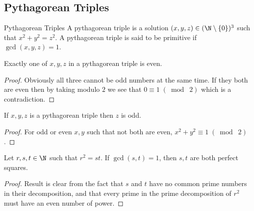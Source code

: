 \subsection{Pythagorean Triples}
\begin{defn}{Pythagorean Triples}{} A pythagorean triple is a solution $(x,y,z)\in(\N\setminus\{0\})^3$ such that $x^2+y^2=z^2$. A pythagorean triple is said to be primitive if $\gcd(x,y,z)=1$. 
\end{defn}

\begin{lmm}{}{} Exactly one of $x,y,z$ in a pythagorean triple is even. \tcbline
\begin{proof}
Obviously all three cannot be odd numbers at the same time. If they both are even then by taking modulo $2$ we see that $0\equiv 1\;(\bmod\;2)$ which is a contradiction. 
\end{proof}
\end{lmm}

\begin{lmm}{}{} If $x,y,z$ is a pythagorean triple then $z$ is odd. \tcbline
\begin{proof}
For odd or even $x,y$ such that not both are even, $x^2+y^2\equiv 1\;(\bmod\;2)$. 
\end{proof}
\end{lmm}

\begin{lmm}{}{} Let $r,s,t\in\N$ such that $r^2=st$. If $\gcd(s,t)=1$, then $s,t$ are both perfect squares. \tcbline
\begin{proof}
Result is clear from the fact that $s$ and $t$ have no common prime numbers in their decomposition, and that every prime in the prime decomposition of $r^2$ must have an even number of power. 
\end{proof}
\end{lmm}

